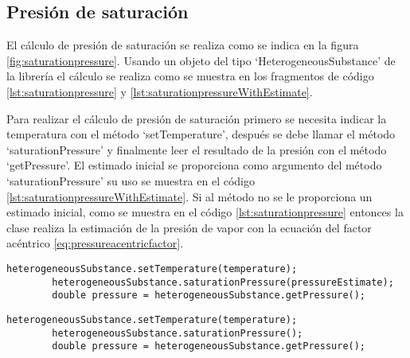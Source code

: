 \subsection{Presión de saturación}\label{subsec:saturationpressure}

	El cálculo de presión de saturación se realiza como se indica en la figura \ref{fig:saturationpressure}. Usando un objeto del tipo `HeterogeneousSubstance' de la librería \Materia el cálculo se realiza como se muestra en los fragmentos de código \ref{lst:saturationpressure} y \ref{lst:saturationpressureWithEstimate}.

	Para realizar el cálculo de presión de saturación primero se necesita indicar la temperatura con el método `setTemperature', después se debe llamar el método `saturationPressure' y finalmente leer el resultado de la presión con el método `getPressure'. El estimado inicial se proporciona como argumento del método `saturationPressure' su uso se muestra en el código \ref{lst:saturationpressureWithEstimate}. Si al método no se le proporciona un estimado inicial, como se muestra en el código \ref{lst:saturationpressure} entonces la clase realiza la estimación de la presión de vapor con la ecuación del factor acéntrico \ref{eq:pressureacentricfactor}. 

	\begin{lstlisting}[label={lst:saturationpressureWithEstimate},caption={Cálculo de la presión de saturación proporcionando un estimado inicial.}]
		heterogeneousSubstance.setTemperature(temperature);
		heterogeneousSubstance.saturationPressure(pressureEstimate);
		double pressure = heterogeneousSubstance.getPressure();
	\end{lstlisting}


	\begin{lstlisting}[label={lst:saturationpressure},caption={Cálculo de la presión de saturación.}]
		heterogeneousSubstance.setTemperature(temperature);
		heterogeneousSubstance.saturationPressure();
		double pressure = heterogeneousSubstance.getPressure();
	\end{lstlisting}

